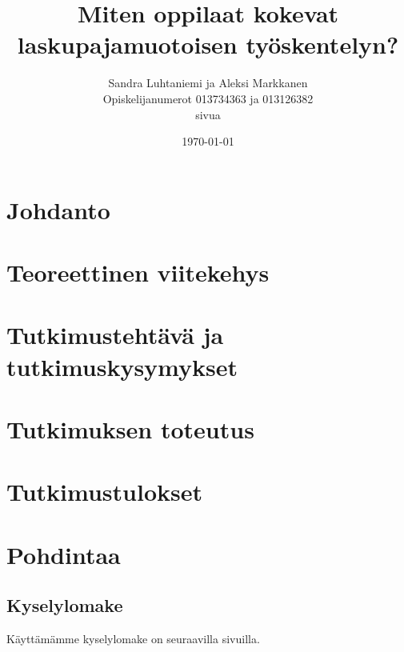 \documentclass[a4paper,12pt,leqno,titlepage]{article}
\begin{document}
\begin{titlepage}
\title{Miten oppilaat kokevat laskupajamuotoisen työskentelyn?} %
\author{Sandra Luhtaniemi ja Aleksi Markkanen\\
Opiskelijanumerot 013734363 ja 013126382\\
\pageref{LastPage} sivua}
\date{\today}
\end{titlepage}
\maketitle
\pagebreak
\tableofcontents
\pagebreak

\section{Johdanto}

\pagebreak
\section{Teoreettinen viitekehys}

\pagebreak
\section{Tutkimustehtävä ja tutkimuskysymykset}

\section{Tutkimuksen toteutus}

\section{Tutkimustulokset}

\pagebreak
\section{Pohdintaa}

\pagebreak

\printbibliography
\pagebreak
\begin{appendices}
\section{Kyselylomake}
Käyttämämme kyselylomake on seuraavilla sivuilla.
\end{appendices}
\end{document}
